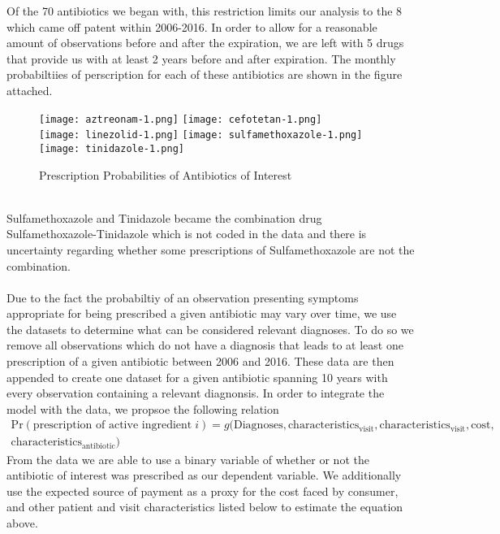 \documentclass[11pt]{SelfArxOneColBMN}
\begin{document}
Of the 70 antibiotics we began with, this restriction limits our analysis to the 8 which came off patent within 2006-2016. In order to allow for a reasonable amount of observations before and after the expiration, we are left with 5 drugs that provide us with at least 2 years before and after expiration. The monthly probabiltiies of perscription for each of these antibiotics are shown in the figure attached.\\
\begin{figure}[h]
\caption{Prescription Probabilities of Antibiotics of Interest}
\centering
\texttt{[image: aztreonam-1.png]}
\texttt{[image: cefotetan-1.png]}\\
\texttt{[image: linezolid-1.png]}
\texttt{[image: sulfamethoxazole-1.png]}\\
\texttt{[image: tinidazole-1.png]}\\
\end{figure}
\\Sulfamethoxazole and Tinidazole became the combination drug Sulfamethoxazole-Tinidazole which is not coded in the data and there is uncertainty regarding whether some prescriptions of Sulfamethoxazole are not the combination.\\
\\
\indent Due to the fact the probabiltiy of an observation presenting symptoms appropriate for being prescribed a given antibiotic may vary over time, we use the datasets to determine what can be considered relevant diagnoses. To do so we remove all observations which do not have a diagnosis that leads to at least one prescription of a given antibiotic between 2006 and 2016. These data are then appended to create one dataset for a given antibiotic spanning 10 years with every observation containing a relevant diagnonsis.  In order to integrate the model with the data, we propsoe the following relation\\
\begin{eqnarray*}
  \text{Pr}(\text{prescription of active ingredient}\; i) = g(\text{Diagnoses},\text{characteristics}_{\text{visit}},\text{characteristics}_\text{visit},\text{cost},\\\text{characteristics}_\text{antibiotic})
\end{eqnarray*}
\indent From the data we are able to use a binary variable of whether or not the antibiotic of interest was prescribed as our dependent variable. We additionally use the expected source of payment as a proxy for the cost faced by consumer, and other patient and visit characteristics listed below to estimate the equation above.\\
\end{document}
